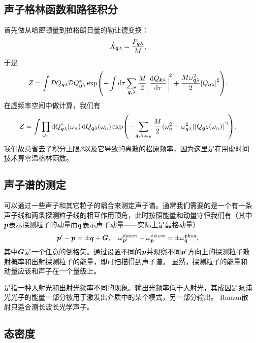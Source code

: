 \subsection{声子格林函数和路径积分}

首先做从哈密顿量到拉格朗日量的勒让德变换：
\[
    \dot{X}_{\vb*{q} \lambda} = \frac{P_{\vb*{q} \lambda}}{M},
\]
于是
\begin{equation}
    Z = \int \mathcal{D} Q_{\vb*{q} \lambda} \mathcal{D} Q^*_{\vb*{q} \lambda} \exp(- \int \dd{\tau} \sum_{\vb*{q}, \lambda} \frac{M}{2} \abs{\dv{Q_{\vb*{k} \lambda}}{\tau}}^2 + \frac{M \omega_{\vb*{q} \lambda}^2}{2} \abs{Q_{\vb*{q} \lambda}}^2 ).
\end{equation}
在虚频率空间中做计算，我们有
\begin{equation}
    Z = \int \prod_{\omega_n} \dd{Q_{\vb*{q} \lambda}^*(\omega_n)} \dd{Q_{\vb*{q} \lambda}(\omega_n)} \exp(- \sum_{\vb*{q}, \lambda, \omega_n} \frac{M}{2} (\omega_n^2 + \omega_{\vb*{q} \lambda}^2) \abs*{Q_{\vb*{q} \lambda}(\omega_n)}^2).
\end{equation}
我们故意省去了积分上限$\beta$以及它导致的离散的松原频率，因为这里是在用虚时间技术算零温格林函数。

\subsection{声子谱的测定}

可以通过一些声子和其它粒子的耦合来测定声子谱。通常我们需要的是一个有一条声子线和两条探测粒子线的相互作用顶角，此时按照能量和动量守恒我们有（其中$\vb*{p}$表示探测粒子的动量而$\vb*{q}$表示声子动量——实际上是晶格动量）
\begin{equation}
    \vb*{p}' - \vb*{p} = \pm \vb*{q} + \vb*{G}, \quad \omega^\text{detect}_{\vb*{p}'} - \omega^\text{detect}_{\vb*{p}} = \pm \omega^\text{phon}_{\vb*{q}},
\end{equation}
其中$\vb*{G}$是一个任意的倒格矢。通过设置不同的$\vb*{p}$并观察不同$\vb*{p}'$方向上的探测粒子散射概率和出射探测粒子的能量，即可扫描得到声子谱。
显然，探测粒子的能量和动量应该和声子在一个量级上。

是指一种入射光和出射光频率不同的现象。输出光频率低于入射光，其成因是泵浦光光子的能量一部分被用于激发出介质中的某个模式，另一部分输出。
Raman散射只适合测长波长光学声子。

\subsection{态密度}

